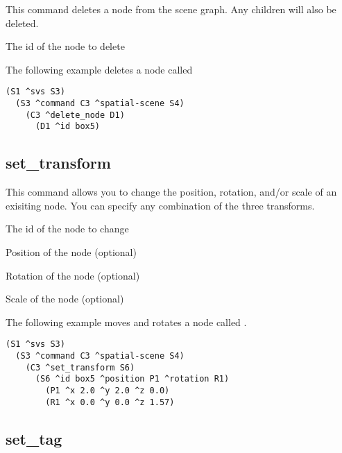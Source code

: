 This command deletes a node from the scene graph. Any children will also be deleted. 

\begin{description}
	\item{} The id of the node to delete
\end{description}

The following example deletes a node called 

\begin{verbatim}
(S1 ^svs S3)
  (S3 ^command C3 ^spatial-scene S4)
    (C3 ^delete_node D1)
      (D1 ^id box5)
\end{verbatim}


\subsection{set\_transform}

This command allows you to change the position, rotation, and/or scale of an 
exisiting node. You can specify any combination of the three transforms. 

\begin{description}
	\item{} The id of the node to change
	\item{} Position of the node (optional)
	\item{} Rotation of the node (optional)
	\item{} Scale of the node (optional)
\end{description}

The following example moves and rotates a node called .

\begin{verbatim}
(S1 ^svs S3)
  (S3 ^command C3 ^spatial-scene S4)
    (C3 ^set_transform S6)
      (S6 ^id box5 ^position P1 ^rotation R1)
        (P1 ^x 2.0 ^y 2.0 ^z 0.0)
        (R1 ^x 0.0 ^y 0.0 ^z 1.57)
\end{verbatim}


\subsection{set\_tag}

